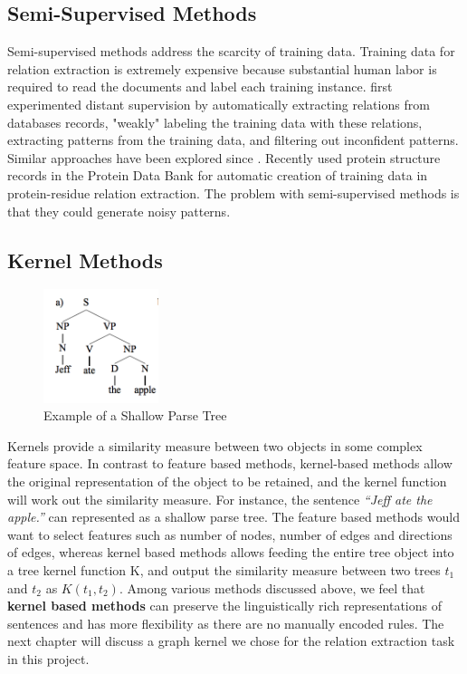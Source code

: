 \subsection{Semi-Supervised Methods}
Semi-supervised methods address the scarcity of training data. Training data for relation extraction is extremely expensive because substantial human labor is required to read the documents and label each training instance. \citet*{craven1999constructing} first experimented distant supervision by automatically extracting relations from databases records, "weakly" labeling the training data with these relations, extracting patterns from the training data, and filtering out inconfident patterns. Similar approaches have been explored since \cite{bunescu2007learning,min2013distant,mintz2009distant}. Recently \citet*{ravikumar2012literature} used protein structure records in the Protein Data Bank for automatic creation of training data in protein-residue relation extraction. The problem with semi-supervised methods is that they could generate noisy patterns\cite{nebhi2013rule}. 

\subsection{Kernel Methods}
\begin{figure}
	\centering
	\includegraphics[width=0.3\textwidth]{shallow_parse_tree}
	\caption{Example of a Shallow Parse Tree \cite{zelenko2003kernel}}
	\label{fig:shallow_parse_tree}   
\end{figure} 
Kernels provide a similarity measure between two objects in some complex feature space. In contrast to feature based methods, kernel-based methods allow the original representation of the object to be retained, and the kernel function will work out the similarity measure. For instance, the sentence \emph{``Jeff ate the apple.''} can represented as a shallow parse tree\cite{zelenko2003kernel}. The feature based methods would want to select features such as number of nodes, number of edges and directions of edges, whereas kernel based methods allows feeding the entire tree object into a tree kernel function K\cite{collins2001convolution}, and output the similarity measure between two trees $t_{1}$ and $t_{2}$ as $K(t_{1}, t_{2})$. Among various methods discussed above, we feel that \textbf{kernel based methods} can preserve the linguistically rich representations of sentences and has more flexibility as there are no manually encoded rules. The next chapter will discuss a graph kernel we chose for the relation extraction task in this project.

